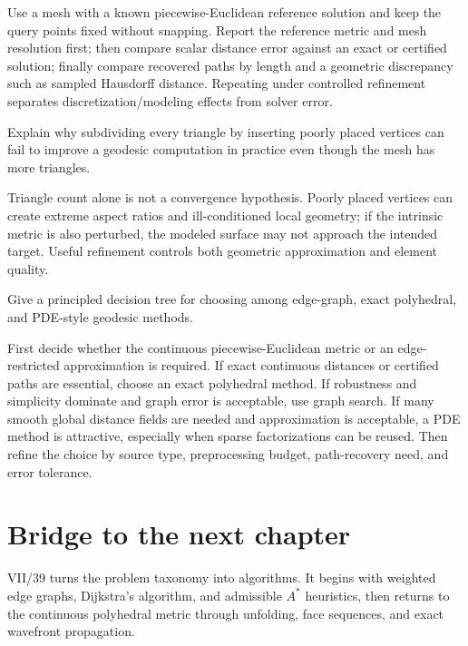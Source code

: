 \begin{solution}
Use a mesh with a known piecewise-Euclidean reference solution and keep the query points fixed without snapping.  Report the reference metric and mesh resolution first; then compare scalar distance error against an exact or certified solution; finally compare recovered paths by length and a geometric discrepancy such as sampled Hausdorff distance.  Repeating under controlled refinement separates discretization/modeling effects from solver error.
\end{solution}

\begin{problem}\label{prob:vii38-ch04}
Explain why subdividing every triangle by inserting poorly placed vertices can fail to improve a geodesic computation in practice even though the mesh has more triangles.
\end{problem}

\begin{solution}
Triangle count alone is not a convergence hypothesis.  Poorly placed vertices can create extreme aspect ratios and ill-conditioned local geometry; if the intrinsic metric is also perturbed, the modeled surface may not approach the intended target.  Useful refinement controls both geometric approximation and element quality.
\end{solution}

\begin{problem}\label{prob:vii38-ch05}
Give a principled decision tree for choosing among edge-graph, exact polyhedral, and PDE-style geodesic methods.
\end{problem}

\begin{solution}
First decide whether the continuous piecewise-Euclidean metric or an edge-restricted approximation is required.  If exact continuous distances or certified paths are essential, choose an exact polyhedral method.  If robustness and simplicity dominate and graph error is acceptable, use graph search.  If many smooth global distance fields are needed and approximation is acceptable, a PDE method is attractive, especially when sparse factorizations can be reused.  Then refine the choice by source type, preprocessing budget, path-recovery need, and error tolerance.
\end{solution}

\section{Bridge to the next chapter}

VII/39 turns the problem taxonomy into algorithms.  It begins with weighted
edge graphs, Dijkstra's algorithm, and admissible \(A^\ast\) heuristics, then
returns to the continuous polyhedral metric through unfolding, face sequences,
and exact wavefront propagation.
